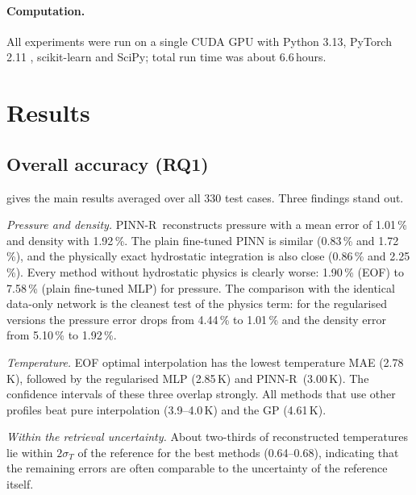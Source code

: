 \documentclass[11pt,a4paper]{article}
\newcommand{\ours}{PINN-R}
\begin{document}
\paragraph{Computation.} All experiments were run on a single CUDA GPU with Python 3.13, PyTorch 2.11 \citep{paszke2019}, scikit-learn \citep{pedregosa2011} and SciPy; total run time was about 6.6\,hours.

\section{Results}\label{sec:results}

\subsection{Overall accuracy (RQ1)}
 gives the main results averaged over all 330 test cases. Three findings stand out.

\emph{Pressure and density.} \ours\ reconstructs pressure with a mean error of 1.01\,\% and density with 1.92\,\%. The plain fine-tuned PINN is similar (0.83\,\% and 1.72\,\%), and the physically exact hydrostatic integration is also close (0.86\,\% and 2.25\,\%). Every method without hydrostatic physics is clearly worse: 1.90\,\% (EOF) to 7.58\,\% (plain fine-tuned MLP) for pressure. The comparison with the identical data-only network is the cleanest test of the physics term: for the regularised versions the pressure error drops from 4.44\,\% to 1.01\,\% and the density error from 5.10\,\% to 1.92\,\%.

\emph{Temperature.} EOF optimal interpolation has the lowest temperature MAE (2.78\,K), followed by the regularised MLP (2.85\,K) and \ours\ (3.00\,K). The confidence intervals of these three overlap strongly. All methods that use other profiles beat pure interpolation (3.9--4.0\,K) and the GP (4.61\,K).

\emph{Within the retrieval uncertainty.} About two-thirds of reconstructed temperatures lie within $2\sigma_T$ of the reference for the best methods (0.64--0.68), indicating that the remaining errors are often comparable to the uncertainty of the reference itself.
\end{document}
